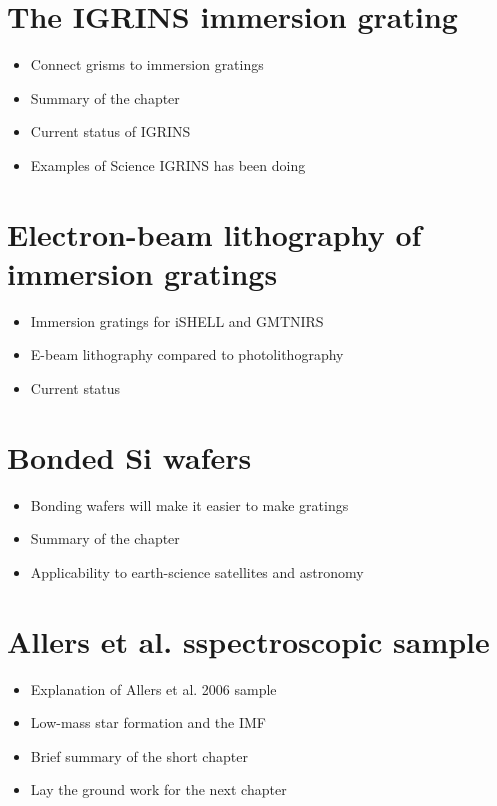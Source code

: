 \section{The IGRINS immersion grating}

\begin{itemize}
	\item Connect grisms to immersion gratings
	\item Summary of the chapter
	\item Current status of IGRINS
	\item Examples of Science IGRINS has been doing
\end{itemize}

\section{Electron-beam lithography of immersion gratings}

\begin{itemize}
	\item Immersion gratings for iSHELL and GMTNIRS
	\item E-beam lithography compared to photolithography
	\item Current status
\end{itemize}

\section{Bonded Si wafers}

\begin{itemize}
	\item Bonding wafers will make it easier to make gratings
	\item Summary of the chapter
	\item Applicability to earth-science satellites and astronomy
\end{itemize}

\section{Allers et al. sspectroscopic sample}

\begin{itemize}
	\item Explanation of Allers et al. 2006 sample
	\item Low-mass star formation and the IMF
	\item Brief summary of the short chapter
	\item Lay the ground work for the next chapter
\end{itemize}

